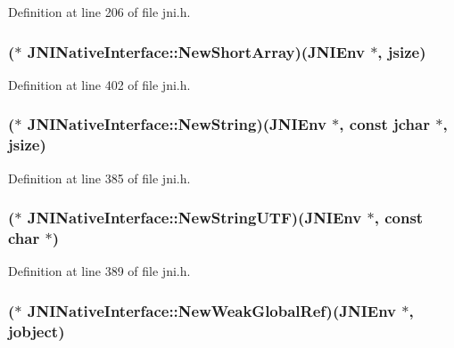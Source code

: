 Definition at line 206 of file jni.\-h.

\hypertarget{struct_j_n_i_native_interface_ae4eac211ac3b8bef50065146b0b60c9c}{
\subsubsection[{New\-Short\-Array}]{($\ast$ J\-N\-I\-Native\-Interface\-::\-New\-Short\-Array)({\bf J\-N\-I\-Env} $\ast$, {\bf jsize})}}\label{struct_j_n_i_native_interface_ae4eac211ac3b8bef50065146b0b60c9c}


Definition at line 402 of file jni.\-h.

\hypertarget{struct_j_n_i_native_interface_a53638aadeb0aacec0a02f1cf96c2cee5}{
\subsubsection[{New\-String}]{($\ast$ J\-N\-I\-Native\-Interface\-::\-New\-String)({\bf J\-N\-I\-Env} $\ast$, const {\bf jchar} $\ast$, {\bf jsize})}}\label{struct_j_n_i_native_interface_a53638aadeb0aacec0a02f1cf96c2cee5}


Definition at line 385 of file jni.\-h.

\hypertarget{struct_j_n_i_native_interface_a02e25802eaaa9407a8f28f1323426e6b}{
\subsubsection[{New\-String\-U\-T\-F}]{($\ast$ J\-N\-I\-Native\-Interface\-::\-New\-String\-U\-T\-F)({\bf J\-N\-I\-Env} $\ast$, const char $\ast$)}}\label{struct_j_n_i_native_interface_a02e25802eaaa9407a8f28f1323426e6b}


Definition at line 389 of file jni.\-h.

\hypertarget{struct_j_n_i_native_interface_a951a84a48ba1395667e6470d5a8132d6}{
\subsubsection[{New\-Weak\-Global\-Ref}]{($\ast$ J\-N\-I\-Native\-Interface\-::\-New\-Weak\-Global\-Ref)({\bf J\-N\-I\-Env} $\ast$, {\bf jobject})}}\label{struct_j_n_i_native_interface_a951a84a48ba1395667e6470d5a8132d6}


